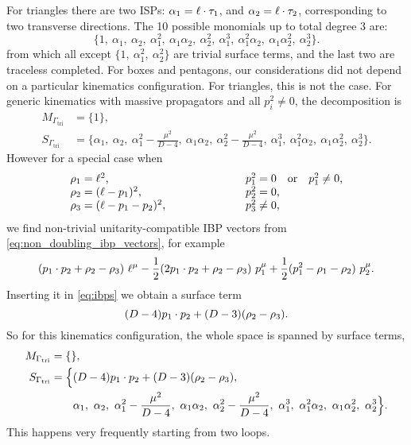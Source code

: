 For triangles there are two ISPs: $ \alpha_1 = \sp(\ell,\tau_1)$, and $\alpha_2 = \sp(\ell,\tau_2)$,
corresponding to two transverse directions.
The 10 possible monomials up to total degree 3 are:
\[
\{1,~\alpha_1,~\alpha_2,~\alpha_1^2,~\alpha_1\alpha_2,~\alpha_2^2,~ \alpha_1^3,~ \alpha_1^2\alpha_2,~ \alpha_1\alpha_2^2,~ \alpha_2^3\}.
\]
from which all except $\{1,~\alpha_1^2,~\alpha_2^2\}$ are trivial surface terms,
and the last two are traceless completed.
For boxes and pentagons, our considerations did not depend on a particular kinematics configuration.
For triangles, this is not the case. For generic kinematics with massive propagators
and all $p_i^2\neq 0$, the decomposition is 
\begin{align*}
  M_{\Gamma_\text{tri} } &= \{1\}, \\
   S_{\Gamma_\text{tri} } &= 
  \{\alpha_1,~\alpha_2,~\alpha_1^2 - \frac{\mu^2}{D-4},~\alpha_1\alpha_2,~\alpha_2^2- \frac{\mu^2}{D-4},~ \alpha_1^3,~ \alpha_1^2\alpha_2,~ \alpha_1\alpha_2^2,~ \alpha_2^3\}.
\end{align*}
However for a special case when
\begin{equation}
  \begin{tabular}{ll}
    $\rho_1 = \ell^2$,               &  $p_1^2=0 \qor p_1^2\neq 0$, \\
    $\rho_2 = (\ell-p_1)^2$,         &  $p_2^2=0$,  \\
    $\rho_3 = (\ell-p_1-p_2)^2$, \hspace{2cm}    & $p_3^2\neq 0$, \\
  \end{tabular}
\end{equation}
we find non-trivial unitarity-compatible IBP vectors from \cref{eq:non_doubling_ibp_vectors}, for example
\[
  (\sp(p_1,p_2) + \rho_2 - \rho_3)~\ell^\mu  - \frac{1}{2} (2 \sp(p_1,p_2) + \rho_2 - \rho_3)~p_1^\mu  + \frac{1}{2}   (p_1^2 - \rho_1 - \rho_2)~p_2^\mu.
\]
Inserting it in \cref{eq:ibps} we obtain a surface term
\[  
  (D-4) \sp(p_1,p_2) + (D-3) (\rho_2-\rho_3).
\]
So for this kinematics configuration, the whole space is spanned by surface terms,
\begin{align*}
  M_{\Gamma_\text{tri} } &= \{\}, \\
   S_{\Gamma_\text{tri} } &= 
  \Big\{(D-4) \sp(p_1,p_2) + (D-3) (\rho_2-\rho_3),\\ 
    &\qquad \alpha_1,~\alpha_2,~\alpha_1^2 - \frac{\mu^2}{D-4},~\alpha_1\alpha_2,~\alpha_2^2- \frac{\mu^2}{D-4},~ \alpha_1^3,~ \alpha_1^2\alpha_2,~ \alpha_1\alpha_2^2,~ \alpha_2^3 \Big\}.
\end{align*}
This happens very frequently starting from two loops.



